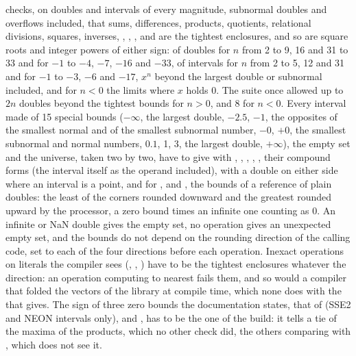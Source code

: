 \documentclass[12pt,a4paper,twoside,openright]{book}
\begin{document}
 checks, on doubles and intervals of every magnitude,
subnormal doubles and overflows included, that sums, differences, products,
quotients, relational divisions, squares, inverses, , ,
, \code{\&} and \code{|} are the tightest enclosures, and so are
square roots and integer powers of either sign:\newinvfive{} of doubles for
$n$ from 2 to 9, 16 and 31 to 33 and for $-1$ to $-4$, $-7$, $-16$ and
$-33$, of intervals for $n$ from 2 to 5, 12 and 31 and for $-1$ to $-3$,
$-6$ and $-17$, $x^n$ beyond the largest double or subnormal included, and
for $n<0$ the limits where $x$ holds 0. The suite once allowed up to $2n$
doubles beyond the tightest bounds for $n>0$, and 8 for $n<0$. Every
interval made of 15 special bounds ($-\infty$, the largest double, $-2.5$,
$-1$, the opposites of the smallest normal and of the smallest subnormal
number, $-0$, $+0$, the smallest subnormal and normal numbers, $0.1$, 1, 3,
the largest double, $+\infty$), the empty set and the universe, taken two by
two, have to give with \code{+}, \code{-}, \code{*}, \code{/}, \code{\%},
their compound forms (the interval itself as the operand included), with a
double on either side where an interval is a point, and for ,
 and , the bounds of a reference of plain doubles:
the least of the corners rounded downward and the greatest rounded upward by
the processor, a zero bound times an infinite one counting as 0. An infinite
or NaN double gives the empty set, no operation gives an unexpected empty
set, and the bounds do not depend on the rounding direction of the calling
code, set to each of the four directions before each operation. Inexact
operations on literals the compiler sees (\code{[0.1] + [0.2]},
\code{[1] / [3]}, ) have to be the tightest enclosures
whatever the direction: an operation computing to nearest fails them, and so
would a compiler that folded the vectors of the library at compile time,
which none does with the  that 
gives. The sign of three zero bounds the documentation states, that of
\code{[-1, 0]*[-1, 0]} (SSE2 and NEON intervals only), 
and \code{[0, 1]/[-2, -1]}, has to be the one of the build: it tells a tie
of the maxima of the products, which no other check did, the others
comparing with \code{==}, which does not see it.
\end{document}
